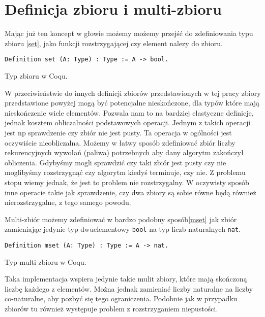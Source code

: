 \section{Definicja zbioru i multi-zbioru}
Mając już ten koncept w głowie możemy możemy przejść do zdefiniowania typu zbioru \ref{set}, jako funkcji rozstrzygającej czy element nalezy do zbioru.
\begin{code}
\begin{verbatim}
Definition set (A: Type) : Type := A -> bool.
\end{verbatim}
\caption{Typ zbioru w Coqu.}
\label{set}
\end{code}
W przeciwieństwie do innych definicji zbiorów przedstawionych w tej pracy zbiory przedstawione powyżej mogą być potencjalne nieskończone, dla typów które mają nieskończenie wiele elementów. Pozwala nam to na bardziej elastyczne definicje, jednak kosztem obliczalności podstawowych operacji. Jednym z takich operacji jest np sprawdzenie czy zbiór nie jest pusty. Ta operacja w ogólności jest oczywiście nieobliczalna. Możemy w łatwy sposób zdefiniować zbiór liczby rekurencyjnych wywołań (paliwa) potrzebnych aby dany algorytm zakończył obliczenia. Gdybyśmy mogli sprawdzić czy taki zbiór jest pusty czy nie moglibyśmy rozstrzygnąć czy algorytm kiedyś terminuje, czy nie. Z problemu stopu wiemy jednak, że jest to problem nie rozstrzygalny. W oczywisty sposób inne operacie takie jak sprawdzenie, czy dwa zbiory są sobie równe będą również nierozstrzygalne, z tego samego powodu. 

Multi-zbiór możemy zdefiniować w bardzo podobny sposób\ref{mset} jak zbiór zamieniając jedynie typ dwuelementowy \texttt{bool} na typ liczb naturalnych \texttt{nat}. 
\begin{code}
\begin{verbatim}
Definition mset (A: Type) : Type := A -> nat.
\end{verbatim}
\caption{Typ multi-zbioru w Coqu.}
\label{mset}
\end{code}
Taka implementacja wspiera jedynie takie mulit zbiory, które mają skończoną liczbę każdego z elementów. Można jednak zamieniać liczby naturalne na liczby co-naturalne, aby pozbyć się tego ograniczenia. Podobnie jak w przypadku zbiorów tu również występuje problem z rozstrzyganiem niepustości.
